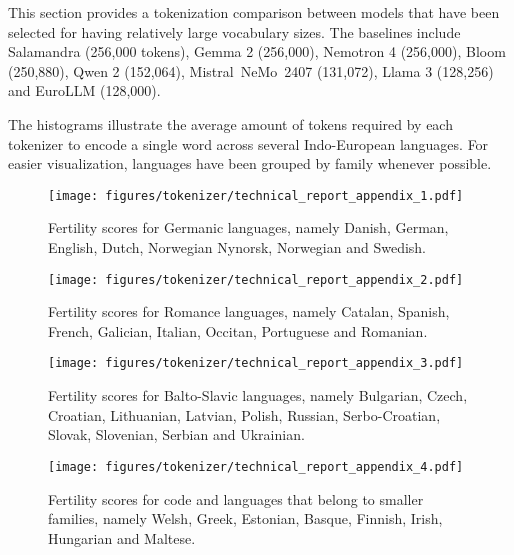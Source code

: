 This section provides a tokenization comparison between models that have been selected for having relatively large vocabulary sizes. The baselines include Salamandra (256,000 tokens), Gemma 2 (256,000), Nemotron 4 (256,000), Bloom (250,880), Qwen 2 (152,064), \hbox{Mistral NeMo 2407} (131,072), Llama 3 (128,256) and EuroLLM (128,000).

The histograms illustrate the average amount of tokens required by each tokenizer to encode a single word across several Indo-European languages. For easier visualization, languages have been grouped by family whenever possible.

\begin{figure}[htbp]
    \centering
    \texttt{[image: figures/tokenizer/technical\_report\_appendix\_1.pdf]}
    \caption{Fertility scores for Germanic languages, namely Danish, German, English, Dutch, Norwegian Nynorsk, Norwegian and Swedish.}
    \label{fig:fertility_plot_app1}
\end{figure}

\begin{figure}[htbp]
    \centering
    \texttt{[image: figures/tokenizer/technical\_report\_appendix\_2.pdf]}
    \caption{Fertility scores for Romance languages, namely Catalan, Spanish, French, Galician, Italian, Occitan, Portuguese and Romanian.}
    \label{fig:fertility_plot_app2}
\end{figure}

\begin{figure}[htbp]
    \centering
    \texttt{[image: figures/tokenizer/technical\_report\_appendix\_3.pdf]}
    \caption{Fertility scores for Balto-Slavic languages, namely Bulgarian, Czech, \hbox{Croatian}, Lithuanian, Latvian, Polish, Russian, Serbo-Croatian, Slovak, Slovenian, Serbian and Ukrainian.}
    \label{fig:fertility_plot_app3}
\end{figure}

\begin{figure}[htbp]
    \centering
    \texttt{[image: figures/tokenizer/technical\_report\_appendix\_4.pdf]}
    \caption{Fertility scores for code and languages that belong to smaller families, namely Welsh, Greek, Estonian, Basque, Finnish, Irish, Hungarian and Maltese.}
    \label{fig:fertility_plot_app4}
\end{figure}